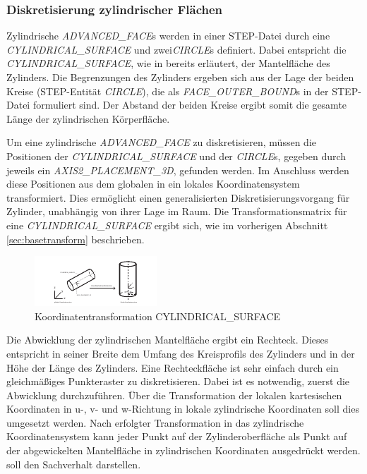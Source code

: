 \subsubsection{Diskretisierung zylindrischer Flächen}

Zylindrische \textit{ADVANCED\_FACE}s werden in einer STEP-Datei durch eine \textit{CYLINDRICAL\_SURFACE} und zwei\textit{CIRCLE}s definiert. Dabei entspricht die \textit{CYLINDRICAL\_SURFACE}, wie in  bereits erläutert, der Mantelfläche des Zylinders. Die Begrenzungen des Zylinders ergeben sich aus der Lage der beiden Kreise (STEP-Entität \textit{CIRCLE}), die als \textit{FACE\_\-OUTER\_\-BOUND}s in der STEP-Datei formuliert sind. Der Abstand der beiden Kreise ergibt somit die gesamte Länge der zylindrischen Körperfläche.

Um eine zylindrische \textit{ADVANCED\_FACE} zu diskretisieren, müssen die Positionen der \textit{CYLINDRICAL\_SURFACE} und der \textit{CIRCLE}s, gegeben durch jeweils ein \textit{AXIS2\_PLACEMENT\_3D}, gefunden werden. Im Anschluss werden diese Positionen aus dem globalen in ein lokales Koordinatensystem transformiert. Dies ermöglicht einen generalisierten Diskretisierungsvorgang für Zylinder, unabhängig von ihrer Lage im Raum. Die Transformationsmatrix für eine \textit{CYLINDRICAL\_SURFACE} ergibt sich, wie im vorherigen Abschnitt \ref{sec:basetransform} beschrieben.  

\begin{figure}[h]
	\centering
	
	\includegraphics[width=\linewidth]{img/trafozylinder.pdf}
	
	\caption{Koordinatentransformation CYLINDRICAL\_SURFACE}
	\label{fig:trafozylinder}
	
\end{figure}

Die Abwicklung der zylindrischen Mantelfläche ergibt ein Rechteck. Dieses entspricht in seiner Breite dem Umfang des Kreisprofils des Zylinders und in der Höhe der Länge des Zylinders. Eine Rechteckfläche ist sehr einfach durch ein gleichmäßiges Punkteraster zu diskretisieren. Dabei ist es notwendig, zuerst die Abwicklung durchzuführen. Über die Transformation der lokalen kartesischen Koordinaten in u-, v- und w-Richtung in lokale zylindrische Koordinaten soll dies umgesetzt werden. Nach erfolgter Transformation in das zylindrische Koordinatensystem kann jeder Punkt auf der Zylinderoberfläche als Punkt auf der abgewickelten Mantelfläche in zylindrischen Koordinaten ausgedrückt werden.  soll den Sachverhalt darstellen. 

